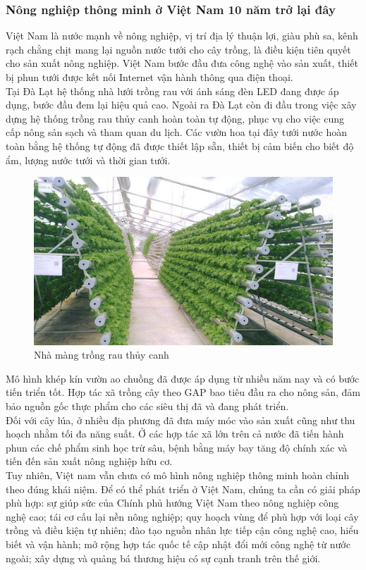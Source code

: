 \subsubsection{Nông nghiệp thông minh ở Việt Nam 10 năm trở lại đây}
Việt Nam là nước mạnh về nông nghiệp, vị trí địa lý thuận lợi, giàu phù sa, kênh rạch chằng chịt mang lại nguồn nước tưới cho cây trồng, là điều kiện tiên quyết cho sản xuất nông nghiệp. Việt Nam bước đầu đưa công nghệ vào sản xuất, thiết bị phun tưới được kết nối Internet vận hành thông qua điện thoại.\\
\indent Tại Đà Lạt hệ thống nhà lưới trồng rau với ánh sáng đèn LED đang được áp dụng, bước đầu đem lại hiệu quả cao. Ngoài ra Đà Lạt còn đi đầu trong việc xây dựng hệ thống trồng rau thủy canh hoàn toàn tự động, phục vụ cho việc cung cấp nông sản sạch và tham quan du lịch. Các vườn hoa tại đây tưới nước hoàn toàn bằng hệ thống tự động đã được thiết lập sẵn, thiết bị cảm biến cho biết độ ẩm, lượng nước tưới và thời gian tưới.
\begin{figure}[H]
	\centering
	\includegraphics[scale=.5]{Chapter 1/image chapter 1/thuycanh.jpg}
	\caption[Nhà màng trồng rau thủy canh]{Nhà màng trồng rau thủy canh}
\end{figure}
\indent Mô hình khép kín vườn ao chuồng đã được áp dụng từ nhiều năm nay và có bước tiến triển tốt. Hợp tác xã trồng cây theo GAP bao tiêu đầu ra cho nông sản, đảm bảo nguồn gốc thực phẩm cho các siêu thị đã và đang phát triển.\\
\indent Đối với cây lúa, ở nhiều địa phương đã đưa máy móc vào sản xuất cũng như thu hoạch nhằm tối đa năng suất. Ở các hợp tác xã lớn trên cả nước đã tiến hành phun các chế phẩm sinh học trừ sâu, bệnh bằng máy bay tăng độ chính xác và tiến đến sản xuất nông nghiệp hữu cơ.\\
\indent Tuy nhiên, Việt nam vẫn chưa có mô hình nông nghiệp thông minh hoàn chỉnh theo đúng khái niệm. Để có thể phát triển ở Việt Nam, chúng ta cần có giải pháp phù hợp: sự giúp sức của Chính phủ hướng Việt Nam theo nông nghiệp công nghệ cao; tái cơ cấu lại nền nông nghiệp; quy hoạch vùng để phù hợp với loại cây trồng và điều kiện tự nhiên; đào tạo nguồn nhân lực tiếp cận công nghệ cao, hiểu biết và vận hành; mở rộng hợp tác quốc tế cập nhật đổi mới công nghệ từ nước ngoài; xây dựng và quảng bá thương hiệu có sự cạnh tranh trên thế giới.
